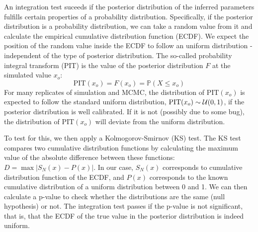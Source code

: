 \documentclass[a4paper,11pt]{article}
\def\p{\mathbb{P}}
\begin{document}
An integration test suceeds if the posterior distribution of the inferred parameters fulfills certain properties of a probability distribution. Specifically, if the posterior distribution is a probability distribution, we can take a random value from it and calculate the empirical cumulative distribution function (ECDF). We expect the position of the random value inside the ECDF to follow an uniform distribution - independent of the type of posterior distribution. The so-called probability integral transform (PIT) \citep{Held2014} is the value of the posterior distribution $F$ at the simulated value $x_o$:
\begin{equation*}
 \mbox{PIT}(x_o) = F(x_o) = \p(X \leq x_o)
\end{equation*}
For many replicates of simulation and MCMC, the distribution of $\mbox{PIT}(x_o)$ is expected to follow the standard uniform distribution, $\mbox{PIT}(x_o) \sim {\cal U}(0, 1)$, if the posterior distribution is well calibrated. If it is not (possibly due to some bug), the distribution of $\mbox{PIT}(x_o)$ will deviate from the uniform distribution.

To test for this, we then apply a Kolmogorov-Smirnov (KS) test. The KS test compares two cumulative distribution functions by calculating the maximum value of the absolute difference between these functions: $D = \max |S_N(x) - P(x)|$. In our case, $S_N(x)$ corresponds to cumulative distribution function of the ECDF, and $P(x)$ corresponds to the known cumulative distribution of a uniform distribution between 0 and 1. We can then calculate a p-value to check whether the distributions are the same (null hypothesis) or not. The integration test passes if the p-value is not significant, that is, that the ECDF of the true value in the posterior distribution is indeed uniform.
\end{document}
